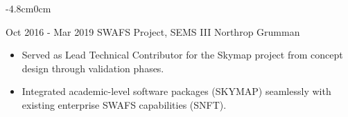 \documentclass[]{src/friggeri-cv}
\begin{document}
\begin{adjustwidth}{-4.8cm}{0cm}
\begin{entrylist}
{\begin{itemize}
    \end{itemize}}
  \entry
    {Oct 2016 - Mar 2019}
    {SWAFS Project, SEMS III}
    {Northrop Grumman}
    {\begin{itemize}
        \item Served as Lead Technical Contributor for the Skymap project from concept design through validation phases.
        \item Integrated academic-level software packages (SKYMAP) seamlessly with existing enterprise SWAFS capabilities (SNFT).
    \end{itemize}}
\end{entrylist}
\end{adjustwidth}
\end{document}
